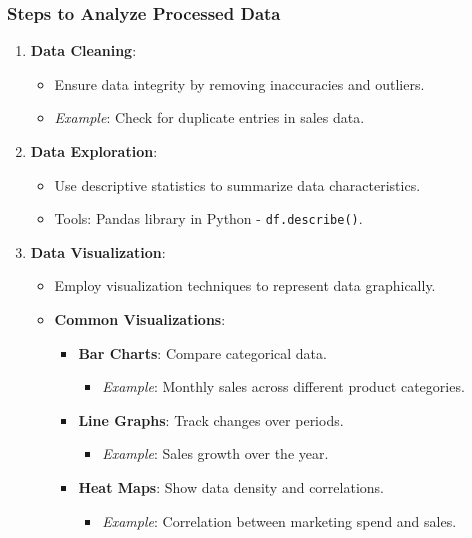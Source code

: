 \documentclass[aspectratio=169]{beamer}
\begin{document}
\begin{frame}[fragile]
    \frametitle{Steps to Analyze Processed Data}
    \begin{enumerate}
        \item \textbf{Data Cleaning}:
            \begin{itemize}
                \item Ensure data integrity by removing inaccuracies and outliers.
                \item \textit{Example}: Check for duplicate entries in sales data.
            \end{itemize}
        \item \textbf{Data Exploration}:
            \begin{itemize}
                \item Use descriptive statistics to summarize data characteristics.
                \item Tools: Pandas library in Python - \texttt{df.describe()}.
            \end{itemize}
        \item \textbf{Data Visualization}:
            \begin{itemize}
                \item Employ visualization techniques to represent data graphically.
                \item \textbf{Common Visualizations}:
                    \begin{itemize}
                        \item \textbf{Bar Charts}: Compare categorical data.
                            \begin{itemize}
                                \item \textit{Example}: Monthly sales across different product categories.
                            \end{itemize}
                        \item \textbf{Line Graphs}: Track changes over periods.
                            \begin{itemize}
                                \item \textit{Example}: Sales growth over the year.
                            \end{itemize}
                        \item \textbf{Heat Maps}: Show data density and correlations.
                            \begin{itemize}
                                \item \textit{Example}: Correlation between marketing spend and sales.
                            \end{itemize}
                    \end{itemize}
            \end{itemize}
    \end{enumerate}
\end{frame}
\end{document}
